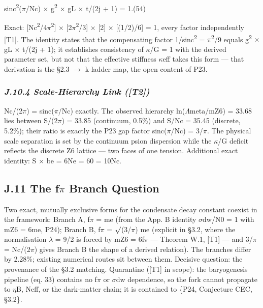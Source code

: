 \documentclass[11pt,letterpaper]{article}
\begin{document}
\begingroup\centering sinc\textsuperscript{2}($\pi$/Nc) $\times$ g\textsuperscript{2} $\times$ gL $\times$ t/(2j + 1) = 1.\hspace{2em}(54)\par\endgroup

\noindent Exact: [Nc\textsuperscript{2}/4$\pi$\textsuperscript{2}] $\times$ [2$\pi$\textsuperscript{2}/3] $\times$ [2] $\times$ [(1/2)/6] = 1, every factor independently [T1]. The identity states that the compensating factor 1/sinc\textsuperscript{2} = $\pi$\textsuperscript{2}/9 equals g\textsuperscript{2} $\times$ gL $\times$ t/(2j + 1); it establishes consistency of $\kappa$/G = 1 with the derived parameter set, but not that the effective stiffness $\kappa$eff takes this form --- that derivation is the §2.3 $\to$ k-ladder map, the open content of P23.

\subsubsection*{\itshape J.10.4  Scale-Hierarchy Link ([T2])}

\noindent Nc/(2$\pi$) = sinc($\pi$/Nc) exactly. The observed hierarchy ln($\Lambda$meta/mZ6) = 33.68 lies between S/(2$\pi$) = 33.85 (continuum, 0.5\%) and S/Nc = 35.45 (discrete, 5.2\%); their ratio is exactly the P23 gap factor sinc($\pi$/Nc) = 3/$\pi$. The physical scale separation is set by the continuum psion dispersion while the $\kappa$/G deficit reflects the discrete Z6 lattice --- two faces of one tension. Additional exact identity: S $\times$ be = 6Ne = 60 = 10Nc.

\subsection*{J.11  The f$\pi$ Branch Question}

\noindent Two exact, mutually exclusive forms for the condensate decay constant coexist in the framework: Branch A, f$\pi$ = me (from the App. B identity $\sigma$dw/N0 = 1 with mZ6 = 6me, P24); Branch B, f$\pi$ = $\surd$(3/$\pi$) me (explicit in §3.2, where the normalisation $\lambda$ = 9/2 is forced by mZ6 = 6f$\pi$ --- Theorem W.1, [T1] --- and 3/$\pi$ = Nc/(2$\pi$) gives Branch B the shape of a derived relation). The branches differ by 2.28\%; existing numerical routes sit between them. Decisive question: the provenance of the §3.2 matching. Quarantine ([T1] in scope): the baryogenesis pipeline (eq. 33) contains no f$\pi$ or $\sigma$dw dependence, so the fork cannot propagate to $\eta$B, Neff, or the dark-matter chain; it is contained to \{P24, Conjecture CEC, §3.2\}.
\end{document}
